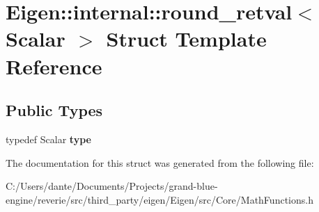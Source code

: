 \hypertarget{struct_eigen_1_1internal_1_1round__retval}{}\section{Eigen\+::internal\+::round\+\_\+retval$<$ Scalar $>$ Struct Template Reference}
\label{struct_eigen_1_1internal_1_1round__retval}
\subsection*{Public Types}
\begin{DoxyCompactItemize}
\item 
\mbox{\label{struct_eigen_1_1internal_1_1round__retval_aa2f8a06b194ad0b157feb3fe1cc78b85}} 
typedef Scalar {\bfseries type}
\end{DoxyCompactItemize}


The documentation for this struct was generated from the following file\+:\begin{DoxyCompactItemize}
\item 
C\+:/\+Users/dante/\+Documents/\+Projects/grand-\/blue-\/engine/reverie/src/third\+\_\+party/eigen/\+Eigen/src/\+Core/Math\+Functions.\+h\end{DoxyCompactItemize}
